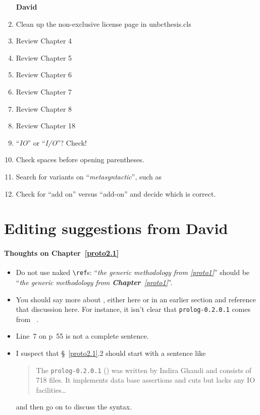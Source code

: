 \begin{scope}
\begin{enumerate}
\item [\textbf{David}]
\item Clean up the non-exclusive license page in unbcthesis.cls
\item Review Chapter 4
\item Review Chapter 5
\item Review Chapter 6
\item Review Chapter 7
\item Review Chapter 8
\item Review Chapter 18
\item ``\textit{IO}'' or ``\textit{I/O}''?  Check!
\item Check spaces before opening parentheses.
\item Search for variants on ``\textit{metasyntactic}'', such as
\item Check for ``add on'' versus ``add-on'' and decide which is correct.
\end{enumerate}

\section{Editing suggestions from David}\label{sec:edit-sugg-david}

\paragraph{Thoughts on Chapter~\ref{proto2.1}}\mbox{}

\begin{itemize}
\item
  Do not use naked \Verb!\ref!s:
  ``\textit{the generic methodology from \ref{proto1}}''
  should be
  ``\textsl{the generic methodology from \textbf{\upshape
      Chapter}~\ref{proto1}}''.
\item
  You should say more about \cite{prolog-lib}, either here or in an
  earlier section and reference that discussion here.  For instance, it
  isn't clear that \Verb!prolog-0.2.0.1! comes from~ \cite{prolog-lib}.
\item
  Line~7 on p~55 is not a complete sentence.
\item
  I suspect that \S~\ref{proto2.1}.2 should start with a sentence like 
  \begin{quote}\color[rgb]{0.3,0,0.6}\small\singlespacing
    The \Verb!prolog-0.2.0.1! (\cite{prolog-lib}) was written by Indira
    Ghandi and consists of 718  files.
    It implements data base assertions and cuts but lacks any IO
    facilities\dots
  \end{quote}
  and then go on to discuss the syntax.
\end{itemize}


\end{scope}
